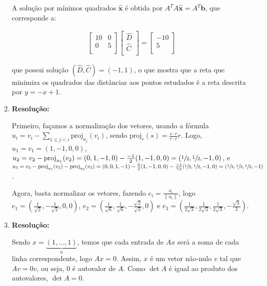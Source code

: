 \documentclass[leqno]{article}
\newcommand{\proj}{\text{proj}}
\begin{document}
\begin{enumerate}
    A solução por mínimos quadrados $\hat{\textbf{x}}$ é obtida por $A^TA\hat{\textbf{x}}=A^T\textbf{b}$, que corresponde a:
    
    \begin{align*}
        \begin{bmatrix}
            10 & 0\\
            0 & 5\\
        \end{bmatrix}\begin{bmatrix}
            \hat{D}\\
            \hat{C}\\
        \end{bmatrix}=\begin{bmatrix}
            -10\\
            5\\
        \end{bmatrix}
    \end{align*}
    
    que possui solução $(\hat{D},\hat{C})=(-1,1)$, o que mostra que a reta que minimiza os quadrados das distâncias aos pontos estudados é a reta descrita por $y=-x+1$.
    
    \item 
    
    \textbf{Resolução:}
    
    Primeiro, façamos a normalização dos vetores, usando a fórmula $u_i=v_i-\sum_{1\leq j<i}\proj_{u_j}(v_i)$, sendo $\proj_r(s)=\frac{s\cdot r}{r\cdot r}r$. Logo, $u_1=v_1=(1,-1,0,0)$, $u_2=v_2-\proj_{u_1}(v_2)=(0,1,-1,0)-\frac{-1}{2}(1,-1,0,0)=(\sfrac{1}{2},\sfrac{1}{2},-1,0)$, e $u_3=v_3-\proj_{u_1}(v_3)-\proj_{u_2}(v_3)=(0,0,1,-1)-\frac{0}{2}(1,-1,0,0)-\frac{-1}{\sfrac{3}{2}}(\sfrac{1}{2},\sfrac{1}{2},-1,0)=(\sfrac{1}{3},\sfrac{1}{3},\sfrac{1}{3},-1)$.
    
    Agora, basta normalizar os vetores, fazendo $e_i=\frac{u_i}{\|u_i\|}$, logo $e_1=(\frac{1}{\sqrt{2}},-\frac{1}{\sqrt{2}},0,0)$, $e_2=(\frac{1}{\sqrt{6}},\frac{1}{\sqrt{6}},-\frac{\sqrt{2}}{\sqrt{3}},0)$ e $e_3=(\frac{1}{2\sqrt{3}},\frac{1}{2\sqrt{3}},\frac{1}{2\sqrt{3}},-\frac{\sqrt{3}}{2})$.
    
    \item 
    
    \textbf{Resolução:}
    
    Sendo $x=\underbrace{(1,\dots,1)}_n$, temos que cada entrada de $Ax$ será a soma de cada linha correspondente, logo $Ax=0$. Assim, $x$ é um vetor não-nulo $v$ tal que $Av=0v$, ou seja, $0$ é autovalor de $A$. Como $\det A$ é igual ao produto dos autovalores, $\det A=0$.
    

\end{enumerate}
\end{document}
